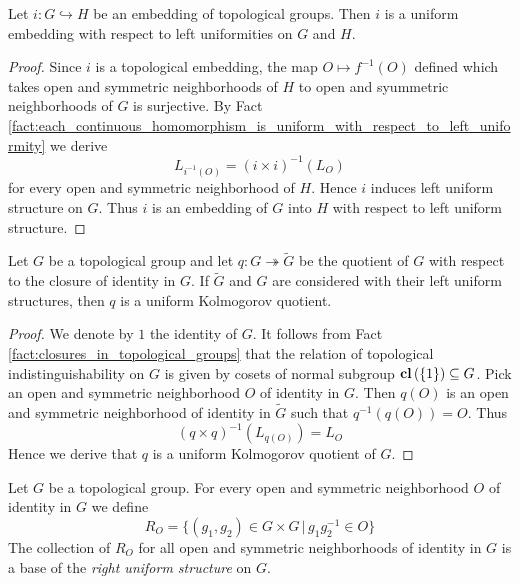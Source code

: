 \documentclass[10pt]{amsart}
\begin{document}
\begin{corollary}\label{corollary:topological_groups_embeddings_is_uniform_embedding}
	Let $i:G\hookrightarrow H$ be an embedding of topological groups. Then $i$ is a uniform embedding with respect to left uniformities on $G$ and $H$.
\end{corollary}
\begin{proof}
	Since $i$ is a topological embedding, the map $O\mapsto f^{-1}(O)$ defined which takes open and symmetric neighborhoods of $H$ to open and syummetric neighborhoods of $G$ is surjective. By Fact \ref{fact:each_continuous_homomorphism_is_uniform_with_respect_to_left_uniformity} we derive
	$$L_{i^{-1}(O)} = \left(i\times i\right)^{-1}(L_O)$$
	for every open and symmetric neighborhood of $H$. Hence $i$ induces left uniform structure on $G$. Thus $i$ is an embedding of $G$ into $H$ with respect to left uniform structure.
\end{proof}

\begin{corollary}\label{corollary:uniform_Kolmogorov_quotients_of_topological_groups}
	Let $G$ be a topological group and let $q:G\twoheadrightarrow \tilde{G}$ be the quotient of $G$ with respect to the closure of identity in $G$. If $\tilde{G}$ and $G$ are considered with their left uniform structures, then $q$ is a uniform Kolmogorov quotient.
\end{corollary}
\begin{proof}
	We denote by $1$ the identity of $G$. It follows from Fact \ref{fact:closures_in_topological_groups} that the relation of topological indistinguishability on $G$ is given by cosets of normal subgroup $\mathbf{cl}\left(\{1\}\right) \subseteq G$. Pick an open and symmetric neighborhood $O$ of identity in $G$. Then $q(O)$ is an open and symmetric neighborhood of identity in $\tilde{G}$ such that $q^{-1}(q(O)) = O$. Thus
	$$\left(q \times q\right)^{-1}(L_{q(O)}) = L_O$$
	Hence we derive that $q$ is a uniform Kolmogorov quotient of $G$.
\end{proof}

\begin{remark}\label{remark:right_uniform_structure}
	Let $G$ be a topological group. For every open and symmetric neighborhood $O$ of identity in $G$ we define
	$$R_O = \big\{(g_1,g_2)\in G\times G\,\big|\,g_1g_2^{-1} \in O\big\}$$
	The collection of $R_O$ for all open and symmetric neighborhoods of identity in $G$ is a base of the \textit{right uniform structure} on $G$.
\end{remark}
\end{document}
